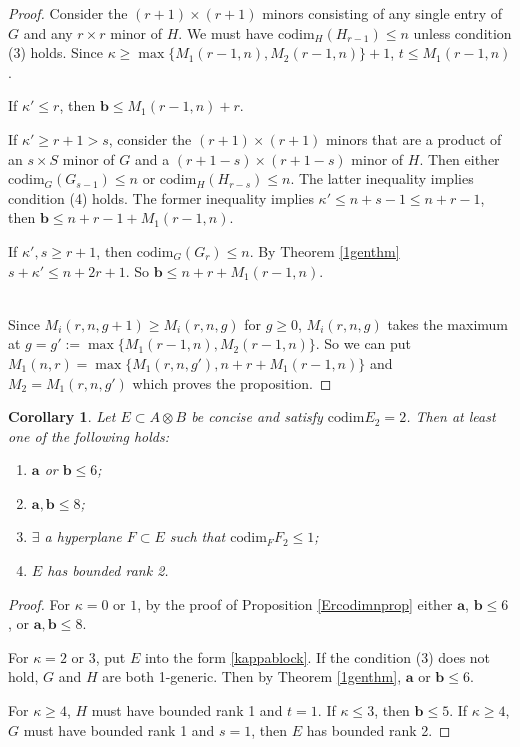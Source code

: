 \documentclass[10pt]{article} %
\newcommand{\aaa}{\mathbf{a}}
\newcommand{\bbb}{\mathbf{b}}
\newcommand{\ot}{\otimes}
\newtheorem{cor}[thm]{Corollary}
\theoremstyle{definition}
\begin{document}
\begin{proof}
Consider the $(r+1)\times(r+1)$ minors consisting of any single entry of $G$ and any $r\times r$ minor of $H$. We must have $\mathrm{codim}_H (H_{r-1})\leq n$ unless condition (3) holds. Since $\kappa\geq \max\{M_1(r-1,n), M_2(r-1,n)\}+1$, $t\leq M_1(r-1,n)$.

If $\kappa'\leq r$, then $\bbb\leq  M_1(r-1,n)+r$.

If $\kappa'\geq r+1>s$, consider the $(r+1)\times(r+1)$ minors that are a product of an $s\times S$ minor of $G$ and a $(r+1-s)\times (r+1-s)$ minor of $H$. Then either $\mathrm{codim}_G (G_{s-1})\leq n$ or $\mathrm{codim}_H (H_{r-s})\leq n$. The latter inequality implies condition (4) holds. The former inequality implies $\kappa'\leq n+s-1\leq n+r-1$, then $\bbb\leq n+r-1+M_1(r-1,n)$.

If $\kappa',s\geq r+1$, then $\mathrm{codim}_G (G_{r})\leq n$. By Theorem \ref{1genthm} $s+\kappa'\leq n+2r+1$. So $\bbb\leq n+r+M_1(r-1,n)$.

~\\
Since $M_i(r,n,g+1)\geq M_i(r,n,g)$ for $g\geq 0$, $M_i(r,n,g)$ takes the maximum at $g=g':=\max\{M_1(r-1,n), M_2(r-1,n)\}$. So we can put $M_1(n,r)=\max\{M_1(r,n,g'),n+r+M_1(r-1,n)\}$ and $M_2=M_1(r,n,g')$ which proves the proposition.
\end{proof}

\begin{cor}\label{E2codim2cor}
Let $E\subset A\ot B$ be concise and satisfy $\mathrm{codim}E_2=2$. Then at least one of the following holds:
\begin{enumerate}
    \item $\aaa$ or $\bbb\leq 6$;
    \item $\aaa,\bbb\leq 8$;
    \item $\exists$ a hyperplane $F\subset E$ such that $\mathrm{codim}_F F_2 \leq 1$;
    \item $E$ has bounded rank 2.
\end{enumerate}
\end{cor}
\begin{proof}
For $\kappa=0$ or $1$, by the proof of Proposition \ref{Ercodimnprop} either $\aaa$, $\bbb\leq 6$, or $\aaa,\bbb\leq 8$.

For $\kappa=2$ or $3$, put $E$ into the form \ref{kappablock}. If the condition (3) does not hold, $G$ and $H$ are both 1-generic. Then by Theorem \ref{1genthm}, $\aaa$ or $\bbb\leq 6$.

For $\kappa\geq 4$, $H$ must have bounded rank 1 and $t=1$. If $\kappa\leq 3$, then $\bbb\leq 5$. If $\kappa\geq 4$, $G$ must have bounded rank 1 and $s=1$, then $E$ has bounded rank 2.
\end{proof}
\end{document}

